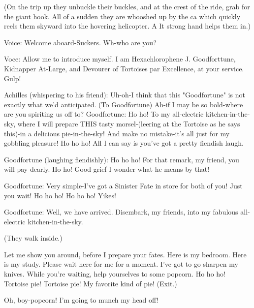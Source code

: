 (On the trip up they unbuckle their buckles, and at the crest of the ride, grab for the giant hook. All of a sudden they are whooshed up by the ca which quickly reels them skyward into the hovering helicopter. A It strong hand helps them in.) 

Voice: Welcome aboard-Suckers. 
\achilles Wh-who are you?\par








Voce: Allow me to introduce myself. I am Hexachlorophene J. Goodforttune, Kidnapper At-Large, and Devourer of Tortoises par Excellence, at your service. 
\tortoise Gulp!\par
Achilles (whispering to his friend): Uh-oh-I think that this "Goodfortune" is not exactly what we'd anticipated. (To Goodfortune) Ah-if I may be so bold-where are you spiriting us off to? Goodfortune: Ho ho! To my all-electric kitchen-in-the-sky, where I will prepare THIS tasty morsel-(leering at the Tortoise as he says this)-in a delicious pie-in-the-sky! And make no mistake-it's all just for my gobbling pleasure! Ho ho ho! 
\achilles All I can say is you've got a pretty fiendish laugh.\par
Goodfortune (laughing fiendishly): Ho ho ho! For that remark, my friend, you will pay dearly. Ho ho! 
\achilles Good grief-I wonder what he means by that!\par
Goodfortune: Very simple-I've got a Sinister Fate in store for both of you! Just you wait! Ho ho ho! Ho ho ho! 
\achilles Yikes!\par
Goodfortune: Well, we have arrived. Disembark, my friends, into my fabulous all-electric kitchen-in-the-sky. 


\intro (They walk inside.) \endintro


Let me show you around, before I prepare your fates. Here is my bedroom. Here is my study. Please wait here for me for a moment. I've got to go sharpen my knives. While you're waiting, help yourselves to some popcorn. Ho ho ho! Tortoise pie! Tortoise pie! My favorite kind of pie! (Exit.) 


\achilles Oh, boy-popcorn! I'm going to munch my head off!\par

